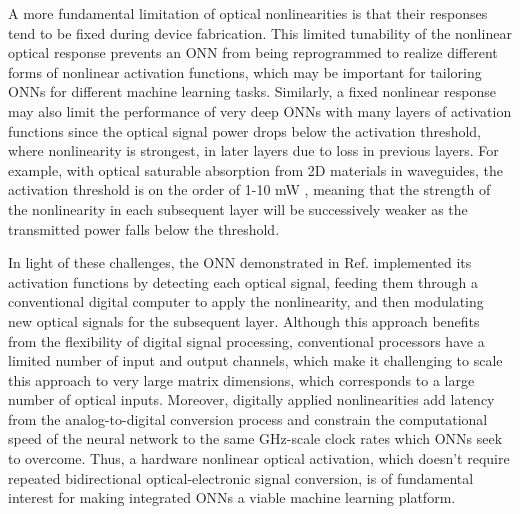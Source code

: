A more fundamental limitation of optical nonlinearities is that their responses tend to be fixed during device fabrication. 
This limited tunability of the nonlinear optical response prevents an ONN from being reprogrammed to realize different forms of nonlinear activation functions, which may be important for tailoring ONNs for different machine learning tasks. 
Similarly, a fixed nonlinear response may also limit the performance of very deep ONNs with many layers of activation functions since the optical signal power drops below the activation threshold, where nonlinearity is strongest, in later layers due to loss in previous layers. 
For example, with optical saturable absorption from 2D materials in waveguides, the activation threshold is on the order of 1-10 mW \cite{bao_monolayer_2011, park_monolayer_2015, jiang_low-dimensional_2018}, meaning that the strength of the nonlinearity in each subsequent layer will be successively weaker as the transmitted power falls below the threshold.

In light of these challenges, the ONN demonstrated in Ref.  implemented its activation functions by detecting each optical signal, feeding them through a conventional digital computer to apply the nonlinearity, and then modulating new optical signals for the subsequent layer. 
Although this approach benefits from the flexibility of digital signal processing, conventional processors have a limited number of input and output channels, which make it challenging to scale this approach to very large matrix dimensions, which corresponds to a large number of optical inputs. 
Moreover, digitally applied nonlinearities add latency from the analog-to-digital conversion process and constrain the computational speed of the neural network to the same GHz-scale clock rates which ONNs seek to overcome. 
Thus, a hardware nonlinear optical activation, which doesn't require repeated bidirectional optical-electronic signal conversion, is of fundamental interest for making integrated ONNs a viable machine learning platform.

